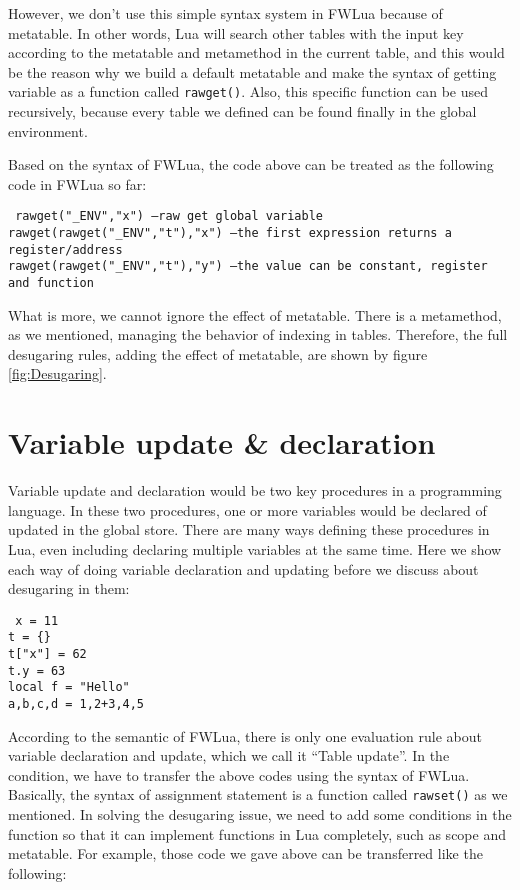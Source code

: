However, we don't use this simple syntax system in FWLua because of metatable. In other words, Lua will search other tables with the input key according to the metatable and metamethod in the current table, and this would be the reason why we build a default metatable and make the syntax of getting variable as a function called {\tt rawget()}. Also, this specific function can be used recursively, because every table we defined can be found finally in the global environment.

Based on the syntax of FWLua, the code above can be treated as the following code in FWLua so far:
\begin{flushleft}
{\tt
rawget("\_ENV","x") --raw get global variable\\
rawget(rawget("\_ENV","t"),"x") --the first expression returns a register/address\\
rawget(rawget("\_ENV","t"),"y") --the value can be constant, register and function\\
}
\end{flushleft}

What is more, we cannot ignore the effect of metatable. There is a metamethod, as we mentioned, managing the behavior of indexing in tables. Therefore, the full desugaring rules, adding the effect of metatable, are shown by figure \ref{fig:Desugaring}.


\section{Variable update \& declaration}
Variable update and declaration would be two key procedures in a programming language. In these two procedures, one or more variables would be declared of updated in the global store. There are many ways defining these procedures in Lua, even including declaring multiple variables at the same time. Here we show each way of doing variable declaration and updating before we discuss about desugaring in them:

\begin{flushleft}
{\tt
x = 11\\
t = \{\}\\
t["x"] = 62\\
t.y = 63\\
local f = "Hello"\\
a,b,c,d = 1,2+3,4,5\\ 
}
\end{flushleft}
According to the semantic of FWLua, there is only one evaluation rule about variable declaration and update, which we call it ``Table update''. In the condition, we have to transfer the above codes using the syntax of FWLua. Basically, the syntax of assignment statement is a function called {\tt rawset()} as we mentioned. In solving the desugaring issue, we need to add some conditions in the function so that it can implement functions in Lua completely, such as scope and metatable. For example, those code we gave above can be transferred like the following:

